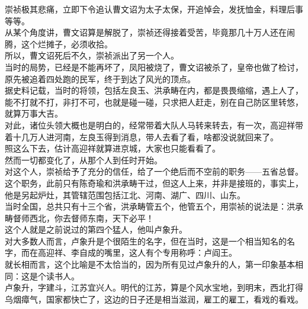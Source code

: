 \begin{multicols}{\theparacolNo}
崇祯极其悲痛，立即下令追认曹文诏为太子太保，开追悼会，发抚恤金，料理后事等等。\\

从某个角度讲，曹文诏算是解脱了，崇祯还得接着受苦，毕竟那几十万人还在闹腾，这个烂摊子，必须收拾。\\

所以，曹文诏死后不久，崇祯派出了另一个人。\\

当时的局势，已经是不能再坏了，凤阳被烧了，曹文诏被杀了，皇帝也做了检讨，原先被追着四处跑的民军，终于到达了风光的顶点。\\

据史料记载，当时的将领，包括左良玉、洪承畴在内，都是畏畏缩缩，遇上人了，能不打就不打，非打不可，也就是碰一碰，只求把人赶走，别在自己防区里转悠，就算万事大吉。\\

对此，诸位头领大概也是明白的，经常带着大队人马转来转去，有一次，高迎祥带着十几万人进河南，左良玉得到消息，带人去看了看，啥都没说就回来了。\\

照这么下去，估计高迎祥就算进京城，大家也只能看看了。\\

然而一切都变化了，从那个人到任时开始。\\

对这个人，崇祯给予了充分的信任，给了一个绝后而不空前的职务——五省总督。\\

这个职务，此前只有陈奇瑜和洪承畴干过，但这人上来，并非是接班的，事实上，他是另起炉灶，其管辖范围包括江北、河南、湖广、四川、山东。\\

当时全国，总共只有十三个省，洪承畴管五个，他管五个，用崇祯的说法是：洪承畴督师西北，你去督师东南，天下必平！\\

这个人就是之前说过的第四个猛人，他叫卢象升。\\

对大多数人而言，卢象升是个很陌生的名字，但在当时，这是一个相当知名的名字，而在高迎祥、李自成的嘴里，这人有个专用称呼：卢阎王。\\

就长相而言，这个比喻是不太恰当的，因为所有见过卢象升的人，第一印象基本相同：这是个读书人。\\

卢象升，字建斗，江苏宜兴人。明代的江苏，算是个风水宝地，到明末，西北打得乌烟瘴气，国家都快亡了，这边的日子还是相当滋润，雇工的雇工，看戏的看戏。\\


\end{multicols}
